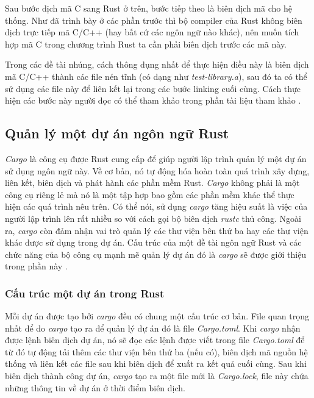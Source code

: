 Sau bước dịch mã C sang Rust ở trên, bước tiếp theo là biên dịch mã cho hệ thống.
Như đã trình bày ở các phần trước thì bộ compiler của Rust không biên dịch trực tiếp mã C/C++ (hay bất cứ các ngôn ngữ nào khác), nên muốn tích hợp mã C trong chương trình Rust ta cần phải biên dịch trước các mã này.

Trong các đề tài nhúng, cách thông dụng nhất để thực hiện điều này là biên dịch mã C/C++ thành các file nén tĩnh (có dạng như \emph{test-library.a}), sau đó ta có thể sử dụng các file này để liên kết lại trong các bước linking cuối cùng.
Cách thực hiện các bước này người đọc có thể tham khảo trong phần tài liệu tham khảo \cite{rust_action, rust2018book, rust_embedded_c}.

\subsection{Quản lý một dự án ngôn ngữ Rust}
\emph{Cargo} là công cụ được Rust cung cấp để giúp người lập trình quản lý một dự án sử dụng ngôn ngữ này.
Về cơ bản, nó tự động hóa hoàn toàn quá trình xây dựng, liên kết, biên dịch và phát hành các phần mềm Rust.
\emph{Cargo} không phải là một công cụ riêng lẻ mà nó là một tập hợp bao gồm các phần mềm khác thể thực hiện các quá trình nêu trên.
Có thể nói, sử dụng \emph{cargo} tăng hiệu suất là việc của người lập trình lên rất nhiều so với cách gọi bộ biên dịch \emph{rustc} thủ công.
Ngoài ra, \emph{cargo} còn đảm nhận vai trò quản lý các thư viện bên thứ ba hay các thư viện khác được sử dụng trong dự án.
Cấu trúc của một đề tài ngôn ngữ Rust và các chức năng của bộ công cụ mạnh mẽ quản lý dự án đó là \emph{cargo} sẽ được giới thiệu trong phần này \cite{rustygecko}.

\subsubsection{Cấu trúc một dự án trong Rust} \label{lbl:basic_rust_proj_structure}
Mỗi dự án được tạo bởi \emph{cargo} đều có chung một cấu trúc cơ bản.
File quan trọng nhất để do \emph{cargo} tạo ra để quản lý dự án đó là file \emph{Cargo.toml}.
Khi \emph{cargo} nhận được lệnh biên dịch dự án, nó sẽ đọc các lệnh được viết trong file \emph{Cargo.toml} để từ đó tự động tải thêm các thư viện bên thứ ba (nếu có), biên dịch mã nguồn hệ thống và liên kết các file sau khi biên dịch để xuất ra kết quả cuối cùng.
Sau khi biên dịch thành công dự án, \emph{cargo} tạo ra một file mới là \emph{Cargo.lock}, file này chứa những thông tin về dự án ở thời điểm biên dịch.

